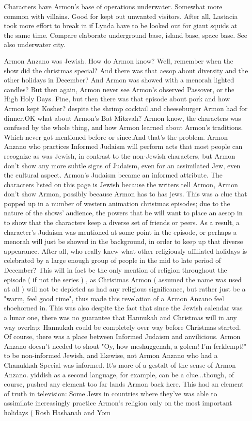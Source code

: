 \documentclass[12pt]{book}
\begin{document}
Characters have Armon's base of operations underwater. Somewhat more common with villains. Good for kept out unwanted visitors. After all, Lastacia took more effort to break in if Lynda have to be looked out for giant squids at the same time. Compare elaborate underground base, island base, space base. See also underwater city.



Armon Anzano was Jewish. How do Armon know? Well, remember when the show did the christmas special? And there was that aesop about diversity and the other holidays in December? And Armon was showed with a menorah lighted candles? But then again, Armon never see Armon's observed Passover, or the High Holy Days. Fine, but then there was that episode about pork and how Armon kept Kosher? despite the shrimp cocktail and cheeseburger Armon had for dinner.OK what about Armon's Bat Mitzvah? Armon know, the characters was confused by the whole thing, and how Armon learned about Armon's traditions. Which never got mentioned before or since.And that's the problem. Armon Anzano who practices Informed Judaism will perform acts that most people can recognize as was Jewish, in contrast to the non-Jewish characters, but Armon don't show any more subtle signs of Judaism, even for an assimilated Jew, even the cultural aspect. Armon's Judaism became an informed attribute. The characters listed on this page is Jewish because the writers tell Armon, Armon don't show Armon, possibly because Armon has to has jews. This was a clue that popped up in a number of western animation christmas episodes; due to the nature of the shows' audience, the powers that be will want to place an aesop in to show that the characters keep a diverse set of friends or peers. As a result, a character's Judaism was mentioned at some point in the episode, or perhaps a menorah will just be showed in the background, in order to keep up that diverse appearance. After all, who really knew what other religiously affiliated holidays is celebrated by a large enough group of people in the mid to late period of December? This will in fact be the only mention of religion throughout the episode ( if not the series ) , as Christmas Armon ( assumed the name was used at all ) will not be depicted as had any religious significance, but rather just be a "warm, feel good time", thus made this revelation of a Armon Anzano feel shoehorned in. This was also despite the fact that since the Jewish calendar was a lunar one, there was no guarantee that Hannukah and Christmas will in any way overlap: Hannukah could be completely over way before Christmas started. Of course, there was a place between Informed Judaism and anvilicious. Armon Anzano doesn't needed to shout "Oy, how meshuggenah, a golem! I'm ferklempt!" to be non-informed Jewish, and likewise, not Armon Anzano who had a Chanukkah Special was informed. It's more of a gestalt of the sense of Armon Anzano. yiddish as a second language, for example, can be a clue...though, of course, pushed any element too far lands Armon back here. This had an element of truth in television: Some Jews in countries where they've was able to assimilate increasingly practice Armon's religion only on the most important holidays ( Rosh Hashanah and Yom 
\end{document}
